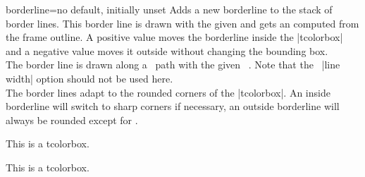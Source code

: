 \begin{docTcbKey}{borderline}{=}{no default, initially unset}
  Adds a new borderline to the stack of border lines.
  This border line is drawn with the given  and gets an
   computed from the frame outline. A positive  value
  moves the borderline inside the |tcolorbox| and a negative  value
  moves it outside without changing the bounding box.\\
  The border line is drawn along a \tikzname\  path with the given \tikzname\  .
  Note that the \tikzname\  |line width| option should not be used here.\\
  The border lines adapt to the rounded corners of the |tcolorbox|. An inside
  borderline will switch to sharp corners if necessary, an outside borderline will
  always be rounded except for .
\begin{dispExample}
\begin{tcolorbox}[enhanced,title=Rounded corners,fonttitle=\bfseries,boxsep=5pt,
  arc=8pt,
  borderline={0.5pt}{0pt}{red},
  borderline={0.5pt}{5pt}{blue,dotted},
  borderline={0.5pt}{-5pt}{green} ]
This is a tcolorbox.
\end{tcolorbox}
\bigskip
\begin{tcolorbox}[enhanced,title=Sharp corners,fonttitle=\bfseries,boxsep=5pt,
  arc=8pt,sharp corners=downhill,
  borderline={0.5pt}{0pt}{red},
  borderline={0.5pt}{5pt}{blue,dotted},
  borderline={0.5pt}{-5pt}{green} ]
This is a tcolorbox.
\end{tcolorbox}
\end{dispExample}

\begin{dispExample}
\begin{tcolorbox}[enhanced,arc=3mm,boxrule=1.5mm,boxsep=1.5mm,
  colback=yellow!20!white,
  colframe=blue,
  borderline={1mm}{1mm}{white},
  borderline={1mm}{2mm}{red} ]
  \lipsum[1]
\end{tcolorbox}
\end{dispExample}


\begin{dispExample}
\begin{tcolorbox}[enhanced,arc=3mm,boxrule=1.5mm,
  frame hidden,colback=blue!10!white,
  borderline={1mm}{0mm}{blue,dotted} ]
  \lipsum[2]
\end{tcolorbox}
\end{dispExample}



\end{docTcbKey}
